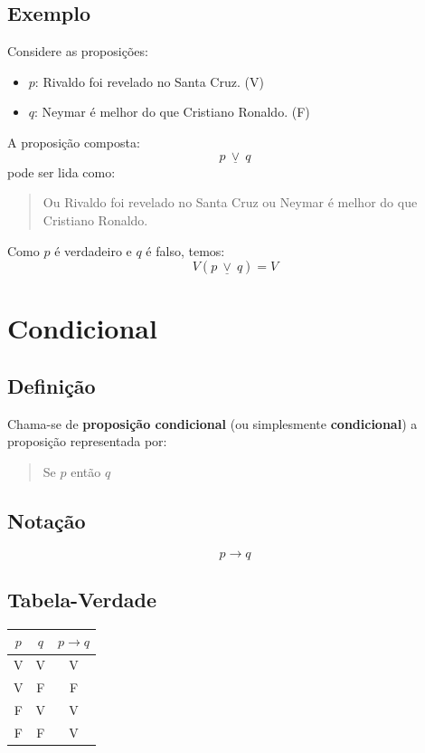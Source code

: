 \subsection{Exemplo}

Considere as proposições:
\begin{itemize}
    \item $p$: Rivaldo foi revelado no Santa Cruz. (V)
    \item $q$: Neymar é melhor do que Cristiano Ronaldo. (F)
\end{itemize}

A proposição composta:
\[
p \ \underline{\vee} \ q
\]
pode ser lida como:

\begin{quote}
Ou Rivaldo foi revelado no Santa Cruz ou Neymar é melhor do que Cristiano Ronaldo.
\end{quote}

Como $p$ é verdadeiro e $q$ é falso, temos:
\[
V(p \ \underline{\vee} \ q) = V
\]

\section{Condicional}

\subsection{Definição}

Chama-se de \textbf{proposição condicional} (ou simplesmente \textbf{condicional}) a proposição representada por:

\begin{quote}
Se $p$ então $q$
\end{quote}

\subsection{Notação}

\[
p \rightarrow q
\]

\subsection{Tabela-Verdade}

\begin{center}
\begin{tabular}{|c|c|c|}
\hline
$p$ & $q$ & $p \rightarrow q$ \\
\hline
V & V & V \\
V & F & F \\
F & V & V \\
F & F & V \\
\hline
\end{tabular}
\end{center}

